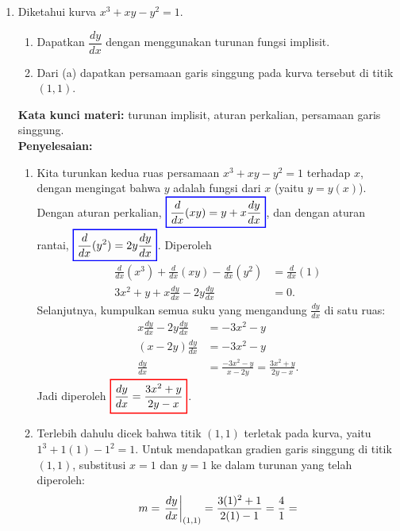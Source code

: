 \documentclass[10pt,openany,a4paper]{article}
\theoremstyle{definition}
\theoremstyle{definition}
\theoremstyle{plain}
\newenvironment{jawab}[2][tes]{%
\par\noindent\textbf{Kata kunci materi:} #1.\\
\textbf{Penyelesaian:} #2%
}{}
\begin{document}
\begin{enumerate}
    \item Diketahui kurva $x^3+xy-y^2=1$.
    \begin{enumerate}
        \item Dapatkan $\dfrac{dy}{dx}$ dengan menggunakan turunan fungsi implisit.
        \item Dari (a) dapatkan persamaan garis singgung pada kurva tersebut di titik $(1,1)$.
    \end{enumerate}
    \begin{jawab}[turunan implisit, aturan perkalian, persamaan garis singgung]{
        \begin{enumerate}
            \item Kita turunkan kedua ruas persamaan $x^3+xy-y^2=1$ terhadap $x$, dengan mengingat bahwa $y$ adalah fungsi dari $x$ (yaitu $y=y(x)$). Dengan aturan perkalian, $\colorlet{oldcolor}{.}
        \color{blue}
        \setlength{\fboxrule}{1pt} \boxed{\color{oldcolor}\frac{d}{dx}(xy) = y + x\frac{dy}{dx}}\color{oldcolor}$, dan dengan aturan rantai, $\colorlet{oldcolor}{.}
        \color{blue}
        \setlength{\fboxrule}{1pt} \boxed{\color{oldcolor}\frac{d}{dx}(y^2) = 2y\frac{dy}{dx}}\color{oldcolor}$. Diperoleh
            \begin{align*}
                \frac{d}{dx}(x^3) + \frac{d}{dx}(xy) - \frac{d}{dx}(y^2) &= \frac{d}{dx}(1)\\
                3x^2 + y + x\frac{dy}{dx} - 2y\frac{dy}{dx} &= 0.
            \end{align*}
            Selanjutnya, kumpulkan semua suku yang mengandung $\frac{dy}{dx}$ di satu ruas:
            \begin{align*}
                x\frac{dy}{dx} - 2y\frac{dy}{dx} &= -3x^2 - y\\
                (x - 2y)\frac{dy}{dx} &= -3x^2 - y\\
                \frac{dy}{dx} &= \frac{-3x^2 - y}{x - 2y} = \frac{3x^2+y}{2y-x}.
            \end{align*}
            Jadi diperoleh $\colorlet{oldcolor}{.}
        \color{red}
        \setlength{\fboxrule}{1pt} \boxed{\color{oldcolor}\frac{dy}{dx} = \frac{3x^2 + y}{2y - x}}\color{oldcolor}$.
            \item Terlebih dahulu dicek bahwa titik $(1,1)$ terletak pada kurva, yaitu $1^3+1(1)-1^2=1$. Untuk mendapatkan gradien garis singgung di titik $(1,1)$, substitusi $x=1$ dan $y=1$ ke dalam turunan yang telah diperoleh:
            \begin{align*}
                m=\left.\frac{dy}{dx}\right|_{(1,1)} = \frac{3(1)^2 + 1}{2(1) - 1}= \frac{4}{1}= \colorlet{oldcolor}{.}

\end{align*}
\end{enumerate}}
\end{jawab}
\end{enumerate}
\end{document}
